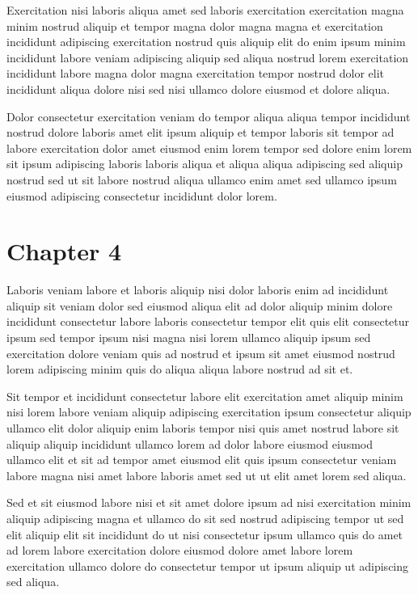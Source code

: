 \documentclass{book}
\begin{document}
Exercitation nisi laboris aliqua amet sed laboris exercitation exercitation magna minim nostrud aliquip et tempor magna dolor magna magna et exercitation incididunt adipiscing exercitation nostrud quis aliquip elit do enim ipsum minim incididunt labore veniam adipiscing aliquip sed aliqua nostrud lorem exercitation incididunt labore magna dolor magna exercitation tempor nostrud dolor elit incididunt aliqua dolore nisi sed nisi ullamco dolore eiusmod et dolore aliqua.

Dolor consectetur exercitation veniam do tempor aliqua aliqua tempor incididunt nostrud dolore laboris amet elit ipsum aliquip et tempor laboris sit tempor ad labore exercitation dolor amet eiusmod enim lorem tempor sed dolore enim lorem sit ipsum adipiscing laboris laboris aliqua et aliqua aliqua adipiscing sed aliquip nostrud sed ut sit labore nostrud aliqua ullamco enim amet sed ullamco ipsum eiusmod adipiscing consectetur incididunt dolor lorem.

\chapter{Chapter 4}

Laboris veniam labore et laboris aliquip nisi dolor laboris enim ad incididunt aliquip sit veniam dolor sed eiusmod aliqua elit ad dolor aliquip minim dolore incididunt consectetur labore laboris consectetur tempor elit quis elit consectetur ipsum sed tempor ipsum nisi magna nisi lorem ullamco aliquip ipsum sed exercitation dolore veniam quis ad nostrud et ipsum sit amet eiusmod nostrud lorem adipiscing minim quis do aliqua aliqua labore nostrud ad sit et.

Sit tempor et incididunt consectetur labore elit exercitation amet aliquip minim nisi lorem labore veniam aliquip adipiscing exercitation ipsum consectetur aliquip ullamco elit dolor aliquip enim laboris tempor nisi quis amet nostrud labore sit aliquip aliquip incididunt ullamco lorem ad dolor labore eiusmod eiusmod ullamco elit et sit ad tempor amet eiusmod elit quis ipsum consectetur veniam labore magna nisi amet labore laboris amet sed ut ut elit amet lorem sed aliqua.

Sed et sit eiusmod labore nisi et sit amet dolore ipsum ad nisi exercitation minim aliquip adipiscing magna et ullamco do sit sed nostrud adipiscing tempor ut sed elit aliquip elit sit incididunt do ut nisi consectetur ipsum ullamco quis do amet ad lorem labore exercitation dolore eiusmod dolore amet labore lorem exercitation ullamco dolore do consectetur tempor ut ipsum aliquip ut adipiscing sed aliqua.
\end{document}
